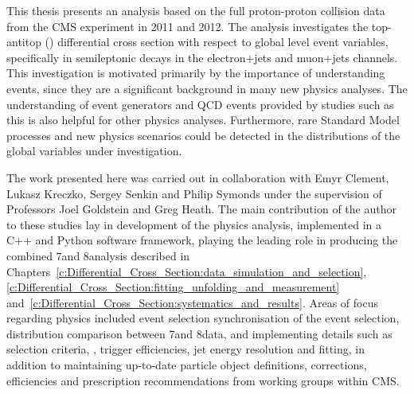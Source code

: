 This thesis presents an analysis based on the full proton-proton collision data from the CMS experiment in
2011 and 2012. The analysis investigates the top-antitop (\ttbar) differential cross section with respect to
global level event variables, specifically in semileptonic \ttbar decays in the electron+jets and muon+jets
channels. This investigation is motivated primarily by the importance of understanding \ttbar events, since
they are a significant background in many new physics analyses. The understanding of event generators and QCD
events provided by studies such as this is also helpful for other physics analyses. Furthermore, rare Standard
Model processes and new physics scenarios could be detected in the distributions of the global variables
under investigation.

The work presented here was carried out in collaboration with Emyr Clement, L{}ukasz Kreczko, Sergey Senkin
and Philip Symonds under the supervision of Professors Joel Goldstein and Greg Heath. The main contribution of
the author to these studies lay in development of the physics analysis, implemented in a C++ and Python
software framework, playing the leading role in producing the combined 7\TeV and 8\TeV analysis described in
Chapters~\ref{c:Differential_Cross_Section:data_simulation_and_selection},
\ref{c:Differential_Cross_Section:fitting_unfolding_and_measurement}
and~\ref{c:Differential_Cross_Section:systematics_and_results}. Areas of focus regarding physics included
event selection synchronisation of the event selection, distribution comparison between 7\TeV and 8\TeV data,
and implementing details such as selection criteria, \btagging, trigger efficiencies, jet energy resolution
and fitting, in addition to maintaining up-to-date particle object definitions, corrections, efficiencies and
prescription recommendations from working groups within CMS.

